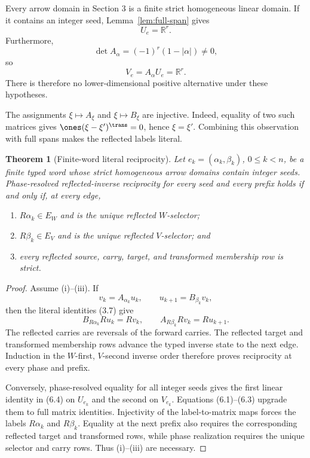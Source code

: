 \documentclass[11pt]{article}
\newtheorem{theorem}{Theorem}[section]
\theoremstyle{definition}
\theoremstyle{remark}
\begin{document}
Every arrow domain in Section 3 is a finite strict homogeneous linear
domain.  If it contains an integer seed, Lemma~\ref{lem:full-span} gives
\[
 U_e=\mathbb R^r.
\tag{6.1}
\]
Furthermore,
\[
 \det A_\alpha=(-1)^r(1-|\alpha|)\neq0,
\tag{6.2}
\]
so
\[
 V_e=A_\alpha U_e=\mathbb R^r.
\tag{6.3}
\]
There is therefore no lower-dimensional positive alternative under these
hypotheses.

The assignments \(\xi\mapsto A_\xi\) and \(\xi\mapsto B_\xi\) are
injective.  Indeed, equality of two such matrices gives
\(\ones(\xi-\xi')^{\trans}=0\), hence \(\xi=\xi'\).  Combining this
observation with full spans makes the reflected labels literal.

\begin{theorem}[Finite-word literal reciprocity]
\label{thm:reciprocity}
Let \(e_k=(\alpha_k,\beta_k)\), \(0\leq k<n\), be a finite typed word whose
strict homogeneous arrow domains contain integer seeds.  Phase-resolved
reflected-inverse reciprocity for every seed and every prefix holds if and
only if, at every edge,
\begin{enumerate}[label=(\roman*)]
\item \(R\alpha_k\in E_W\) and is the unique reflected \(W\)-selector;
\item \(R\beta_k\in E_V\) and is the unique reflected \(V\)-selector; and
\item every reflected source, carry, target, and transformed membership row
is strict.
\end{enumerate}
\end{theorem}

\begin{proof}
Assume (i)--(iii).  If
\[
 v_k=A_{\alpha_k}u_k,\qquad
 u_{k+1}=B_{\beta_k}v_k,
\]
then the literal identities (3.7) give
\[
 B_{R\alpha_k}Ru_k=Rv_k,\qquad
 A_{R\beta_k}Rv_k=Ru_{k+1}.
\tag{6.4}
\]
The reflected carries are reversals of the forward carries.  The reflected
target and transformed membership rows advance the typed inverse state to
the next edge.  Induction in the \(W\)-first, \(V\)-second inverse order
therefore proves reciprocity at every phase and prefix.

Conversely, phase-resolved equality for all integer seeds gives the first
linear identity in (6.4) on \(U_{e_k}\) and the second on \(V_{e_k}\).
Equations (6.1)--(6.3) upgrade them to full matrix identities.  Injectivity
of the label-to-matrix maps forces the labels \(R\alpha_k\) and
\(R\beta_k\).  Equality at the next prefix also requires the corresponding
reflected target and transformed rows, while phase realization requires
the unique selector and carry rows.  Thus (i)--(iii) are necessary.
\end{proof}
\end{document}
